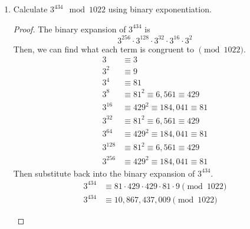\documentclass[11pt]{article}
\theoremstyle{definition}
\begin{document}
\begin{enumerate}
\begin{proof}
    \end{proof}
    \item Calculate $3^{434} \mod{1022}$ using binary exponentiation.
    \begin{proof}
        The binary expansion of $3^{434}$ is 
        \[
            3^{256} \cdot 3^{128} \cdot 3^{32} \cdot 3^{16} \cdot 3^2
        \]
        Then, we can find what each term is congruent to $\pmod{1022}$. 
        \begin{align*}
            3 &\equiv 3 \\
            3^2 &\equiv 9 \\
            3^4 &\equiv 81 \\
            3^8 &\equiv 81^2 \equiv 6,561 \equiv 429 \\
            3^{16} &\equiv 429^2 \equiv 184,041 \equiv 81 \\
            3^{32} &\equiv 81^2 \equiv 6,561 \equiv 429 \\
            3^{64} &\equiv 429^2 \equiv 184,041 \equiv 81 \\
            3^{128} &\equiv 81^2 \equiv 6,561 \equiv 429 \\
            3^{256} &\equiv 429^2 \equiv 184,041 \equiv 81
        \end{align*}
        Then substitute back into the binary expansion of $3^{434}$.
        \begin{align*}
            3^{434} &\equiv 81\cdot 429\cdot 429\cdot 81\cdot 9 \pmod{1022} \\
            3^{434} &\equiv 10,867,437,009 \pmod{1022}
        \end{align*}
        \begin{center}
        \end{center}
    \end{proof}


\end{enumerate}
\end{document}
